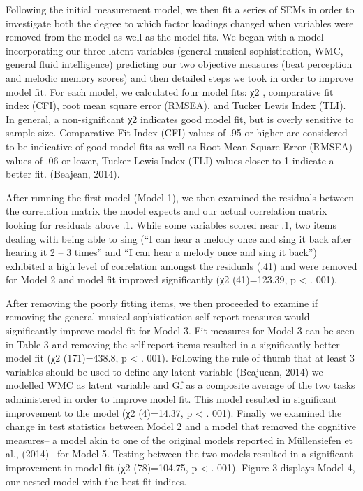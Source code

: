 \documentclass[]{book}
\theoremstyle{definition}
\theoremstyle{definition}
\theoremstyle{definition}
\theoremstyle{remark}
\begin{document}
Following the initial measurement model, we then fit a series of SEMs in
order to investigate both the degree to which factor loadings changed
when variables were removed from the model as well as the model fits. We
began with a model incorporating our three latent variables (general
musical sophistication, WMC, general fluid intelligence) predicting our
two objective measures (beat perception and melodic memory scores) and
then detailed steps we took in order to improve model fit. For each
model, we calculated four model fits: χ2 , comparative fit index (CFI),
root mean square error (RMSEA), and Tucker Lewis Index (TLI). In
general, a non-significant χ2 indicates good model fit, but is overly
sensitive to sample size. Comparative Fit Index (CFI) values of .95 or
higher are considered to be indicative of good model fits as well as
Root Mean Square Error (RMSEA) values of .06 or lower, Tucker Lewis
Index (TLI) values closer to 1 indicate a better fit. (Beajean, 2014).

After running the first model (Model 1), we then examined the residuals
between the correlation matrix the model expects and our actual
correlation matrix looking for residuals above .1. While some variables
scored near .1, two items dealing with being able to sing (``I can hear
a melody once and sing it back after hearing it 2 -- 3 times'' and ``I
can hear a melody once and sing it back'') exhibited a high level of
correlation amongst the residuals (.41) and were removed for Model 2 and
model fit improved significantly (χ2 (41)=123.39, p \textless{} . 001).

After removing the poorly fitting items, we then proceeded to examine if
removing the general musical sophistication self-report measures would
significantly improve model fit for Model 3. Fit measures for Model 3
can be seen in Table 3 and removing the self-report items resulted in a
significantly better model fit (χ2 (171)=438.8, p \textless{} . 001).
Following the rule of thumb that at least 3 variables should be used to
define any latent-variable (Beajuean, 2014) we modelled WMC as latent
variable and Gf as a composite average of the two tasks administered in
order to improve model fit. This model resulted in significant
improvement to the model (χ2 (4)=14.37, p \textless{} . 001). Finally we
examined the change in test statistics between Model 2 and a model that
removed the cognitive measures-- a model akin to one of the original
models reported in Müllensiefen et al., (2014)-- for Model 5. Testing
between the two models resulted in a significant improvement in model
fit (χ2 (78)=104.75, p \textless{} . 001). Figure 3 displays Model 4,
our nested model with the best fit indices.
\end{document}

